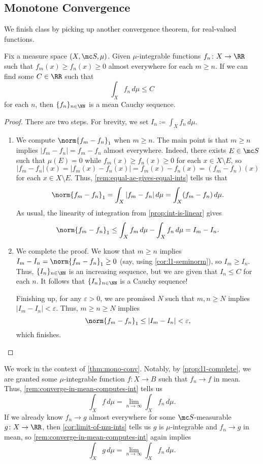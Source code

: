 \documentclass[../notes.tex]{subfiles}
\begin{document}
\subsection{Monotone Convergence}
We finish class by picking up another convergence theorem, for real-valued functions.
\begin{theorem} \label{thm:mono-conv}
	Fix a measure space $(X,\mc S,\mu)$. Given $\mu$-integrable functions $f_n\colon X\to\RR$ such that $f_m(x)\ge f_n(x)\ge0$ almost everywhere for each $m\ge n$. If we can find some $C\in\RR$ such that
	\[\int_Xf_n\,d\mu\le C\]
	for each $n$, then $\{f_n\}_{n\in\NN}$ is a mean Cauchy sequence.
\end{theorem}
\begin{proof}
	There are two steps. For brevity, we set $I_n\coloneqq\int_Xf_n\,d\mu$.
	\begin{enumerate}
		\item We compute $\norm{f_m-f_n}_1$ when $m\ge n$. The main point is that $m\ge n$ implies $|f_m-f_n|=f_m-f_n$ almost everywhere. Indeed, there exists $E\in\mc S$ such that $\mu(E)=0$ while $f_m(x)\ge f_n(x)\ge0$ for each $x\in X\setminus E$, so
		\[|f_m-f_n|(x)=|f_m(x)-f_n(x)|=f_m(x)-f_n(x)=(f_m-f_n)(x)\]
		for each $x\in X\setminus E$. Thus, \autoref{rem:equal-ae-gives-equal-ints} tells us that
		\[\norm{f_m-f_n}_1=\int_X|f_m-f_n|\,d\mu=\int_X(f_m-f_n)\,d\mu.\]
		As usual, the linearity of integration from \autoref{prop:int-is-linear} gives
		\[\norm{f_m-f_n}_1\le\int_Xf_m\,d\mu-\int_Xf_n\,d\mu=I_m-I_n.\]

		\item We complete the proof. We know that $m\ge n$ implies $I_m-I_n=\norm{f_m-f_n}_1\ge0$ (say, using \autoref{cor:l1-seminorm}), so $I_m\ge I_n$. Thus, $\{I_n\}_{n\in\NN}$ is an increasing sequence, but we are given that $I_n\le C$ for each $n$. It follows that $\{I_n\}_{n\in\NN}$ is a Cauchy sequence!

		Finishing up, for any $\varepsilon>0$, we are promised $N$ such that $m,n\ge N$ implies $|I_m-I_n|<\varepsilon$. Thus, $m\ge n\ge N$ implies
		\[\norm{f_m-f_n}_1\le|I_m-I_n|<\varepsilon,\]
		which finishes.
		\qedhere
	\end{enumerate}
\end{proof}
\begin{remark} \label{rem:apply-mono-conv}
	We work in the context of \autoref{thm:mono-conv}. Notably, by \autoref{prop:l1-complete}, we are granted some $\mu$-integrable function $f\colon X\to B$ such that $f_n\to f$ in mean. Thus, \autoref{rem:converge-in-mean-computes-int} tells us
	\[\int_Xf\,d\mu=\lim_{n\to\infty}\int_Xf_n\,d\mu.\]
	If we already know $f_n\to g$ almost everywhere for some $\mc S$-measurable $g\colon X\to\RR$, then \autoref{cor:limit-of-mu-ints} tells us $g$ is $\mu$-integrable and $f_n\to g$ in mean, so \autoref{rem:converge-in-mean-computes-int} again implies
	\[\int_Xg\,d\mu=\lim_{n\to\infty}\int_Xf_n\,d\mu.\]
\end{remark}
\end{document}
